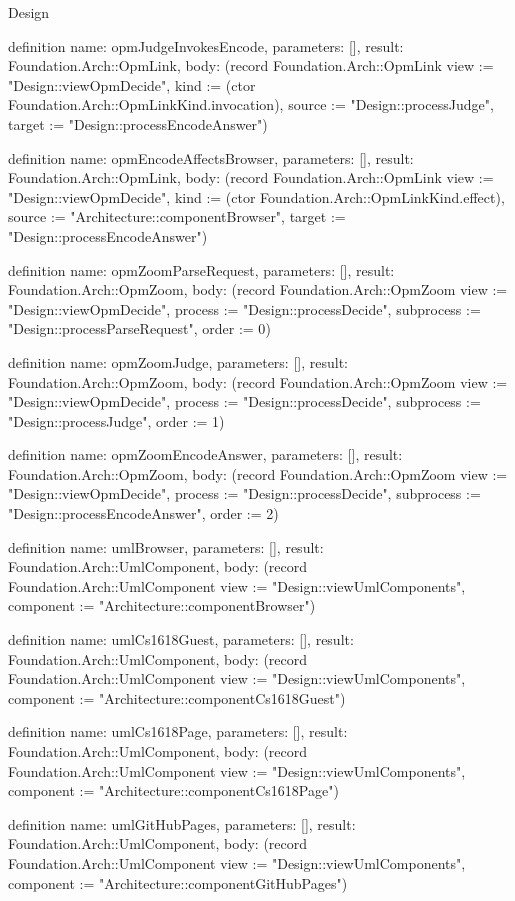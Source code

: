 \begin{lexlean}{Design}
\begin{semanticmodule}
definition{
  name: opmJudgeInvokesEncode,
  parameters: [],
  result: Foundation.Arch::OpmLink,
  body: (record Foundation.Arch::OpmLink {view := "Design::viewOpmDecide", kind := (ctor Foundation.Arch::OpmLinkKind.invocation), source := "Design::processJudge", target := "Design::processEncodeAnswer"})
}

definition{
  name: opmEncodeAffectsBrowser,
  parameters: [],
  result: Foundation.Arch::OpmLink,
  body: (record Foundation.Arch::OpmLink {view := "Design::viewOpmDecide", kind := (ctor Foundation.Arch::OpmLinkKind.effect), source := "Architecture::componentBrowser", target := "Design::processEncodeAnswer"})
}

definition{
  name: opmZoomParseRequest,
  parameters: [],
  result: Foundation.Arch::OpmZoom,
  body: (record Foundation.Arch::OpmZoom {view := "Design::viewOpmDecide", process := "Design::processDecide", subprocess := "Design::processParseRequest", order := 0})
}

definition{
  name: opmZoomJudge,
  parameters: [],
  result: Foundation.Arch::OpmZoom,
  body: (record Foundation.Arch::OpmZoom {view := "Design::viewOpmDecide", process := "Design::processDecide", subprocess := "Design::processJudge", order := 1})
}

definition{
  name: opmZoomEncodeAnswer,
  parameters: [],
  result: Foundation.Arch::OpmZoom,
  body: (record Foundation.Arch::OpmZoom {view := "Design::viewOpmDecide", process := "Design::processDecide", subprocess := "Design::processEncodeAnswer", order := 2})
}

definition{
  name: umlBrowser,
  parameters: [],
  result: Foundation.Arch::UmlComponent,
  body: (record Foundation.Arch::UmlComponent {view := "Design::viewUmlComponents", component := "Architecture::componentBrowser"})
}

definition{
  name: umlCs1618Guest,
  parameters: [],
  result: Foundation.Arch::UmlComponent,
  body: (record Foundation.Arch::UmlComponent {view := "Design::viewUmlComponents", component := "Architecture::componentCs1618Guest"})
}

definition{
  name: umlCs1618Page,
  parameters: [],
  result: Foundation.Arch::UmlComponent,
  body: (record Foundation.Arch::UmlComponent {view := "Design::viewUmlComponents", component := "Architecture::componentCs1618Page"})
}

definition{
  name: umlGitHubPages,
  parameters: [],
  result: Foundation.Arch::UmlComponent,
  body: (record Foundation.Arch::UmlComponent {view := "Design::viewUmlComponents", component := "Architecture::componentGitHubPages"})
}


\end{semanticmodule}
\end{lexlean}
